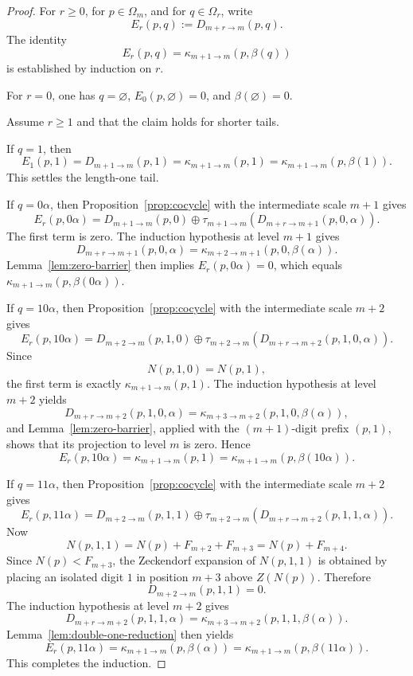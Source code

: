 \documentclass[11pt,reqno]{amsart}
\numberwithin{equation}{section}
\theoremstyle{plain}
\theoremstyle{definition}
\theoremstyle{remark}
\begin{document}
\begin{proof}
For $r\ge 0$, for $p\in\Omega_m$, and for $q\in\Omega_r$, write
\[
E_r(p,q):=D_{m+r\to m}(p,q).
\]
The identity
\[
E_r(p,q)=\kappa_{m+1\to m}(p,\beta(q))
\]
is established by induction on $r$.

For $r=0$, one has $q=\varnothing$, $E_0(p,\varnothing)=0$, and
$\beta(\varnothing)=0$.

Assume $r\ge 1$ and that the claim holds for shorter tails.

If $q=1$, then
\[
E_1(p,1)=D_{m+1\to m}(p,1)=\kappa_{m+1\to m}(p,1)
=
\kappa_{m+1\to m}(p,\beta(1)).
\]
This settles the length-one tail.

If $q=0\alpha$, then Proposition~\ref{prop:cocycle} with the intermediate scale
$m+1$ gives
\[
E_r(p,0\alpha)
=
D_{m+1\to m}(p,0)
\oplus
\tau_{m+1\to m}(D_{m+r\to m+1}(p,0,\alpha)).
\]
The first term is zero.  The induction hypothesis at level $m+1$ gives
\[
D_{m+r\to m+1}(p,0,\alpha)
=
\kappa_{m+2\to m+1}(p,0,\beta(\alpha)).
\]
Lemma~\ref{lem:zero-barrier} then implies $E_r(p,0\alpha)=0$, which equals
$\kappa_{m+1\to m}(p,\beta(0\alpha))$.

If $q=10\alpha$, then Proposition~\ref{prop:cocycle} with the intermediate
scale $m+2$ gives
\[
E_r(p,10\alpha)
=
D_{m+2\to m}(p,1,0)
\oplus
\tau_{m+2\to m}(D_{m+r\to m+2}(p,1,0,\alpha)).
\]
Since
\[
N(p,1,0)=N(p,1),
\]
the first term is exactly $\kappa_{m+1\to m}(p,1)$.  The induction hypothesis
at level $m+2$ yields
\[
D_{m+r\to m+2}(p,1,0,\alpha)
=
\kappa_{m+3\to m+2}(p,1,0,\beta(\alpha)),
\]
and Lemma~\ref{lem:zero-barrier}, applied with the $(m+1)$-digit prefix
$(p,1)$, shows that its projection to level $m$ is zero.  Hence
\[
E_r(p,10\alpha)=\kappa_{m+1\to m}(p,1)
=
\kappa_{m+1\to m}(p,\beta(10\alpha)).
\]

If $q=11\alpha$, then Proposition~\ref{prop:cocycle} with the intermediate
scale $m+2$ gives
\[
E_r(p,11\alpha)
=
D_{m+2\to m}(p,1,1)
\oplus
\tau_{m+2\to m}(D_{m+r\to m+2}(p,1,1,\alpha)).
\]
Now
\[
N(p,1,1)=N(p)+F_{m+2}+F_{m+3}=N(p)+F_{m+4}.
\]
Since $N(p)<F_{m+3}$, the Zeckendorf expansion of $N(p,1,1)$ is obtained by
placing an isolated digit $1$ in position $m+3$ above $Z(N(p))$.  Therefore
\[
D_{m+2\to m}(p,1,1)=0.
\]
The induction hypothesis at level $m+2$ gives
\[
D_{m+r\to m+2}(p,1,1,\alpha)
=
\kappa_{m+3\to m+2}(p,1,1,\beta(\alpha)).
\]
Lemma~\ref{lem:double-one-reduction} then yields
\[
E_r(p,11\alpha)
=
\kappa_{m+1\to m}(p,\beta(\alpha))
=
\kappa_{m+1\to m}(p,\beta(11\alpha)).
\]
This completes the induction.


\end{proof}
\end{document}
